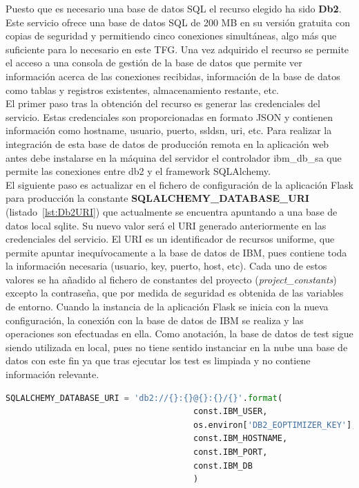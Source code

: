 Puesto que es necesario una base de datos SQL el recurso elegido ha sido \textbf{Db2}. Este servicio ofrece una base de datos SQL de 200 MB en su versión gratuita con copias de seguridad y permitiendo cinco conexiones simultáneas, algo más que suficiente para lo necesario en este \gls{TFG}. Una vez adquirido el recurso se permite el acceso a una consola de gestión de la base de datos que permite ver información acerca de las conexiones recibidas, información de la base de datos como tablas y registros existentes, almacenamiento restante, etc.\\El primer paso tras la obtención del recurso es generar las credenciales del servicio. Estas credenciales son proporcionadas en formato \gls{JSON} y contienen información como hostname, usuario, puerto, ssldsn, uri, etc. Para realizar la integración de esta base de datos de producción remota en la aplicación web antes debe instalarse en la máquina del servidor el controlador ibm\_db\_sa que permite las conexiones entre db2 y el framework SQLAlchemy.\\El siguiente paso es actualizar en el fichero de configuración de la aplicación Flask para producción la constante \textbf{SQLALCHEMY\_DATABASE\_URI} (listado~\ref{lst:Db2URI}) que actualmente se encuentra apuntando a una base de datos local sqlite. Su nuevo valor será el URI generado anteriormente en las credenciales del servicio. El URI es un identificador de recursos uniforme, que permite apuntar inequívocamente a la base de datos de IBM, pues contiene toda la información necesaria (usuario, key, puerto, host, etc). Cada uno de estos valores se ha añadido al fichero de constantes del proyecto (\textit{project\_constants}) excepto la contraseña, que por medida de seguridad es obtenida de las variables de entorno. Cuando la instancia de la aplicación Flask se inicia con la nueva configuración, la conexión con la base de datos de IBM se realiza y las operaciones son efectuadas en ella. Como anotación, la base de datos de test sigue siendo utilizada en local, pues no tiene sentido instanciar en la nube una base de datos con este fin ya que tras ejecutar los test es limpiada y no contiene información relevante.\\
\begin{lstlisting}[language=Python,float=ht,numbers=none,caption={URI de Db2 para SQLAlchemy en \textit{prod\_config}},label={lst:Db2URI}]
SQLALCHEMY_DATABASE_URI = 'db2://{}:{}@{}:{}/{}'.format(
                                      const.IBM_USER,
                                      os.environ['DB2_EOPTIMIZER_KEY'],
                                      const.IBM_HOSTNAME,
                                      const.IBM_PORT,
                                      const.IBM_DB
                                      )
\end{lstlisting}

